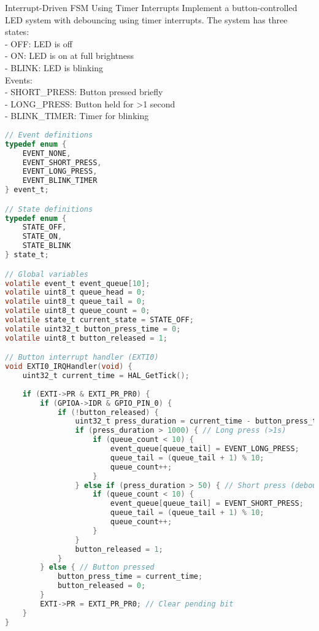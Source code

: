 \begin{example2}{Interrupt-Driven FSM Using Timer Interrupts}
Implement a button-controlled LED system with debouncing using timer interrupts.
\tcblower
The system has three states:\\
- OFF: LED is off\\
- ON: LED is on at full brightness\\
- BLINK: LED is blinking
\vspace{1mm}\\
Events:\\
- SHORT\_PRESS: Button pressed briefly\\
- LONG\_PRESS: Button held for >1 second\\
- BLINK\_TIMER: Timer for blinking

\begin{lstlisting}[language=C, style=basesmol]
// Event definitions
typedef enum {
    EVENT_NONE,
    EVENT_SHORT_PRESS,
    EVENT_LONG_PRESS,
    EVENT_BLINK_TIMER
} event_t;

// State definitions
typedef enum {
    STATE_OFF,
    STATE_ON,
    STATE_BLINK
} state_t;

// Global variables
volatile event_t event_queue[10];
volatile uint8_t queue_head = 0;
volatile uint8_t queue_tail = 0;
volatile uint8_t queue_count = 0;
volatile state_t current_state = STATE_OFF;
volatile uint32_t button_press_time = 0;
volatile uint8_t button_released = 1;

// Button interrupt handler (EXTI0)
void EXTI0_IRQHandler(void) {
    uint32_t current_time = HAL_GetTick();
    
    if (EXTI->PR & EXTI_PR_PR0) {
        if (GPIOA->IDR & GPIO_PIN_0) {
            if (!button_released) {
                uint32_t press_duration = current_time - button_press_time;
                if (press_duration > 1000) { // Long press (>1s)
                    if (queue_count < 10) {
                        event_queue[queue_tail] = EVENT_LONG_PRESS;
                        queue_tail = (queue_tail + 1) % 10;
                        queue_count++;
                    }
                } else if (press_duration > 50) { // Short press (debounced)
                    if (queue_count < 10) {
                        event_queue[queue_tail] = EVENT_SHORT_PRESS;
                        queue_tail = (queue_tail + 1) % 10;
                        queue_count++;
                    }
                }
                button_released = 1;
            }
        } else { // Button pressed
            button_press_time = current_time;
            button_released = 0;
        }
        EXTI->PR = EXTI_PR_PR0; // Clear pending bit
    }
}
\end{lstlisting}
\end{example2}

